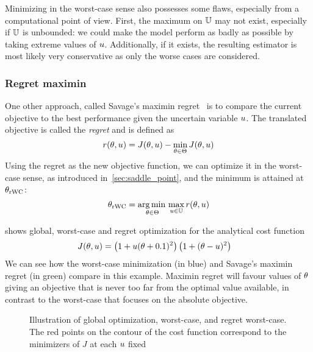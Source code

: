 \documentclass[../../Main_ManuscritThese.tex]{subfiles}
\newcommand\imgpath{/home/victor/acadwriting/Manuscrit/Text/Chapter3/img/}
\begin{document}
Minimizing in the worst-case sense also possesses some flaws,
especially from a computational point of view.  First, the maximum on
$\mathbb{U}$ may not exist, especially if $\mathbb{U}$ is unbounded: we
could make the model perform as badly as possible by taking extreme
values of $u$.  Additionally, if it exists, the resulting estimator
is most likely very conservative as only the worse cases are
considered.

\subsubsection{Regret maximin}
\label{ssec:regret_savage}
One other approach, called Savage's maximin regret~\cite{savage_theory_1951} is to compare the current objective to the best performance given the uncertain variable $u$. The translated objective is called the \emph{regret} and is defined as
\begin{equation}
  \label{eq:def_regret_savage}
  r(\theta, u) = J(\theta, u) - \min_{\theta \in \Theta} J(\theta, u)
\end{equation}
Using the regret as the new objective function, we can optimize it in the worst-case sense, as introduced in~\cref{sec:saddle_point}, and the minimum is attained at ${\theta}_{\mathrm{rWC}}$:
\begin{equation}
  {\theta}_{\mathrm{rWC}} = \operatorname*{arg\,min \,}_{\theta\in\Theta} \max_{u \in \mathbb{U}} r(\theta, u)
\end{equation}

\begin{example}
 shows global, worst-case and regret optimization for the analytical cost function
\begin{align}
  \label{eq:decision_under_unc}
  J(\theta, u) &= \left(1 + u(\theta + 0.1)^2\right)\left(1 + (\theta - u)^2\right)
\end{align}
We can see how the worst-case minimization (in blue) and Savage's
maximin regret (in green) compare in this example. Maximin regret will
favour values of $\theta$ giving an objective that is never too far from
the optimal value available, in contrast to the worst-case that
focuses on the absolute objective.
\end{example}

\begin{figure}[ht]
  \centering
  
  \caption[Robust optimisation under uncertainty set]{\label{fig:decision_under_uncertainty} Illustration of global optimization, worst-case, and regret worst-case. The red points on the contour of the cost function correspond to the minimizers of $J$ at each $u$ fixed}
\end{figure}
\end{document}
